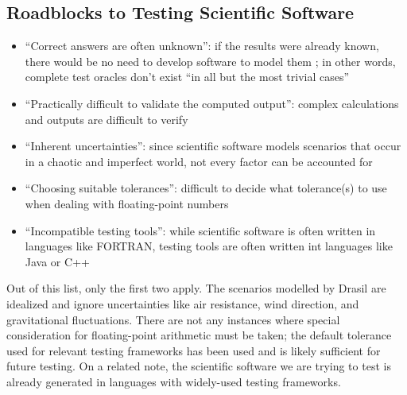 \subsection{Roadblocks to Testing Scientific Software
      \cite[p.~67]{kanewala_metamorphic_2019}}
\label{chap:notes:sec:sci-testing-roadblocks}
\begin{itemize}
      \item ``Correct answers are often unknown'': if the results were already
            known, there would be no need to develop software to model them
            \cite[p.~67]{kanewala_metamorphic_2019}; in other words, complete
            test oracles don't exist ``in all but the most trivial cases''
            \cite[p.~510]{barr_oracle_2015}
      \item ``Practically difficult to validate the computed output'': complex
            calculations and outputs are difficult to verify
            \cite[p.~67]{kanewala_metamorphic_2019}
      \item ``Inherent uncertainties'': since scientific software models
            scenarios that occur in a chaotic and imperfect world, not every
            factor can be accounted for \cite[p.~67]{kanewala_metamorphic_2019}
      \item ``Choosing suitable tolerances'': difficult to decide what
            tolerance(s) to use when dealing with floating-point numbers
            \cite[p.~67]{kanewala_metamorphic_2019}
      \item ``Incompatible testing tools'': while scientific software is often
            written in languages like FORTRAN, testing tools are often written
            int languages like Java or C++ \cite[p.~67]{kanewala_metamorphic_2019}
\end{itemize}

Out of this list, only the first two apply. The scenarios modelled by Drasil
are idealized and ignore uncertainties like air resistance, wind direction,
and gravitational fluctuations. There are not any instances where special
consideration for floating-point arithmetic must be taken; the default
tolerance used for relevant testing frameworks has been used
 and is likely sufficient for future testing. On a related
note, the scientific software we are trying to test is already generated in
languages with widely-used testing frameworks. 
